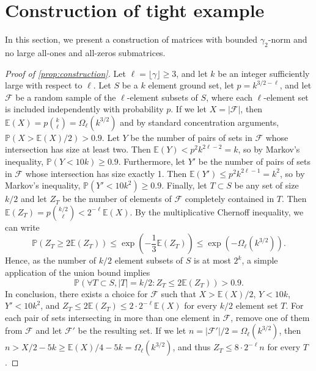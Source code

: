 \documentclass[11pt]{amsart}
\theoremstyle{plain}
\theoremstyle{definition}
\begin{document}
\section{Construction of tight example}\label{sect:construction}

In this section, we present a construction of matrices with bounded $\gamma_2$-norm and no large all-ones and all-zeros submatrices.

\begin{proof}[Proof of \cref{prop:construction}]
 Let $\ell=\lfloor\gamma\rfloor\geq 3$, and let $k$ be an integer sufficiently large with respect to $\ell$. Let $S$ be a $k$ element ground set, let $p=k^{3/2-\ell}$, and let $\mathcal{F}$ be a random sample of the $\ell$-element subsets of $S$, where each $\ell$-element set is included independently with probability $p$. If we let $X=|\mathcal{F}|$, then $\mathbb{E}(X)=p\binom{k}{\ell}=\Omega_{\ell}(k^{3/2})$ and by standard concentration arguments, $\mathbb{P}(X>\mathbb{E}(X)/2)>0.9$. Let $Y$ be the number of pairs of sets in $\mathcal{F}$ whose intersection has size at least two. Then $\mathbb{E}(Y)<p^2k^{2\ell-2}=k$, so by Markov's inequality, $\mathbb{P}(Y<10k)\geq 0.9$. Furthermore, let $Y'$ be the number of pairs of sets in $\mathcal{F}$ whose intersection has size exactly 1. Then $\mathbb{E}(Y')\leq p^2 k^{2\ell-1}=k^2$, so by Markov's inequality, $\mathbb{P}(Y'<10k^2)\geq 0.9$.  Finally, let $T\subset S$ be any set of size $k/2$ and let $Z_T$ be the number of elements of $\mathcal{F}$ completely contained in $T$. Then $\mathbb{E}(Z_T)=p\binom{k/2}{\ell}<2^{-\ell}\mathbb{E}(X)$. By the multiplicative Chernoff inequality, we can write
$$\mathbb{P}(Z_T\geq 2\mathbb{E}(Z_T))\leq \exp\left(-\frac{1}{3}\mathbb{E}(Z_T)\right)\leq \exp(-\Omega_{\ell}(k^{3/2})).$$
Hence, as the number of $k/2$ element subsets of $S$ is at most $2^k$, a simple application of the union bound  implies $$\mathbb{P}(\forall T\subset S, |T|=k/2: Z_T\leq 2\mathbb{E}(Z_T))>0.9.$$
In conclusion, there exists a choice for $\mathcal{F}$ such that $X>\mathbb{E}(X)/2$, $Y<10k$, $Y'<10k^2$, and $Z_T\leq 2\mathbb{E}(Z_T)\leq 2\cdot 2^{-\ell}\mathbb{E}(X)$ for every $k/2$ element set $T$. For each  pair of sets intersecting in more than one element in $\mathcal{F}$, remove one of them from $\mathcal{F}$ and let $\mathcal{F}'$ be the resulting set. If we let $n=|\mathcal{F}'|/2=\Omega_{\ell}(k^{3/2})$, then $n>X/2-5k\geq \mathbb{E}(X)/4-5k =\Omega_{\ell}(k^{3/2})$, and thus $Z_T\leq 8\cdot 2^{-\ell}n$ for every $T$.


\end{proof}
\end{document}
